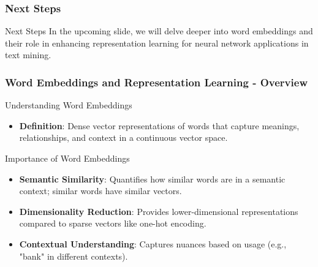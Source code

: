 \documentclass[aspectratio=169]{beamer}
\begin{document}
\begin{frame}
    \frametitle{Next Steps}
    \begin{block}{Next Steps}
        In the upcoming slide, we will delve deeper into word embeddings and their role in enhancing representation learning for neural network applications in text mining.
    \end{block}
\end{frame}

\begin{frame}[fragile]
    \frametitle{Word Embeddings and Representation Learning - Overview}
    \begin{block}{Understanding Word Embeddings}
        \begin{itemize}
            \item \textbf{Definition}: Dense vector representations of words that capture meanings, relationships, and context in a continuous vector space.
        \end{itemize}
    \end{block}
    
    \begin{block}{Importance of Word Embeddings}
        \begin{itemize}
            \item \textbf{Semantic Similarity}: Quantifies how similar words are in a semantic context; similar words have similar vectors.
            \item \textbf{Dimensionality Reduction}: Provides lower-dimensional representations compared to sparse vectors like one-hot encoding.
            \item \textbf{Contextual Understanding}: Captures nuances based on usage (e.g., "bank" in different contexts).
        \end{itemize}
    \end{block}
\end{frame}
\end{document}
